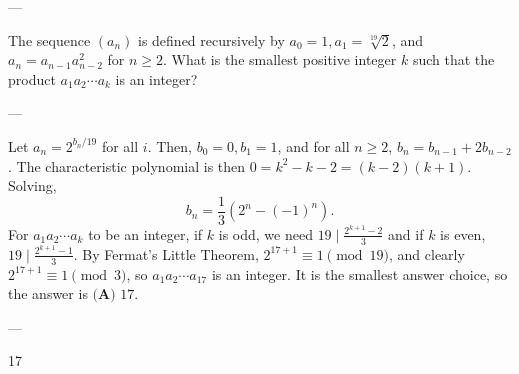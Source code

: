 
---

The sequence $(a_n)$ is defined recursively by $a_0=1,a_1=\sqrt[19]2$, and $a_n=a_{n-1}a_{n-2}^2$ for $n\ge 2$. What is the smallest positive integer $k$ such that the product $a_1a_2\cdots a_k$ is an integer?

---

Let $a_n=2^{b_n/19}$ for all $i$. Then, $b_0=0,b_1=1$, and for all $n\ge 2$, $b_n=b_{n-1}+2b_{n-2}$. The characteristic polynomial is then $0=k^2-k-2=(k-2)(k+1)$. Solving, \[b_n=\frac13\left(2^n-(-1)^n\right).\]
For $a_1a_2\cdots a_k$ to be an integer, if $k$ is odd, we need $19\mid\frac{2^{k+1}-2}3$ and if $k$ is even, $19\mid\frac{2^{k+1}-1}3$. By Fermat's Little Theorem, $2^{17+1}\equiv 1\pmod{19}$, and clearly $2^{17+1}\equiv 1\pmod{3}$, so $a_1a_2\cdots a_{17}$ is an integer. It is the smallest answer choice, so the answer is $\boxed{\textbf{(A) }17}$.

---

17
